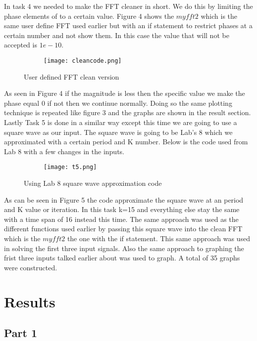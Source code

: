 \documentclass[12pt,a4paper]{article}
\begin{document}
 In task 4 we needed to make the FFT cleaner in short. We do this by limiting the phase elements of to a certain value. Figure 4 shows the $myfft2$ which is the same user define FFT used earlier but with an if statement to restrict phases at a certain number and not show them. In this case the value that will not be accepted is $1e-10$.
 
\begin{figure}[h]
\begin{subfigure}{ 1\textwidth}
\texttt{[image: cleancode.png]}
\end{subfigure}
\caption{User defined FFT clean version}
\label{fig:image2}
\end{figure}
As seen in Figure 4 if the magnitude is less then the specific value we make the phase equal 0 if not then we continue normally.
Doing so the same plotting technique is repeated like figure 3 and the graphs are shown in the result section. Lastly Task 5 is done in a similar way except this time we are going to use a square wave as our input. The square wave is going to be Lab's 8 which we approximated with a certain period and K number. Below is the code used from Lab 8 with a few changes in the inputs.
\clearpage

\begin{figure}[h]
\begin{subfigure}{ 1\textwidth}
\texttt{[image: t5.png]}
\end{subfigure}
\caption{Using Lab 8 square wave approximation code}
\label{fig:image2}
\end{figure}
As can be seen in Figure 5 the code approximate the square wave at an period and K value or iteration. In this task k=15 and everything else stay the same with a time span of 16 instead this time. The same approach was used as the different functions used earlier by passing this square wave into the clean FFT which is the $myfft2$ the one with the if statement. This same approach was used in solving the first three input signals.  Also the same approach to graphing the frist three inputs talked earlier about was used to graph. A total of 35 graphs were constructed.
 
 \clearpage

\section{Results}\label{sec:res}

\subsection{Part 1}
\end{document}
